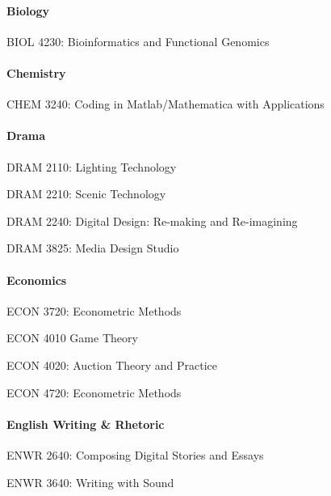 \paragraph{Biology}
\begin{itemlist}
\item BIOL 4230: Bioinformatics and Functional Genomics
\end{itemlist}


\paragraph{Chemistry}
\begin{itemlist}
\item CHEM 3240: Coding in Matlab/Mathematica with Applications
\end{itemlist}


\paragraph{Drama}
\begin{itemlist}
\item DRAM 2110: Lighting Technology
\item DRAM 2210: Scenic Technology
\item DRAM 2240: Digital Design: Re-making and Re-imagining
\item DRAM 3825: Media Design Studio
\end{itemlist}


\paragraph{Economics}
\begin{itemlist}
\item ECON 3720: Econometric Methods 
\item ECON 4010 Game Theory
\item ECON 4020: Auction Theory and Practice
\item ECON 4720: Econometric Methods
\end{itemlist}

\paragraph{English Writing \& Rhetoric}
\begin{itemlist}
\item ENWR 2640: Composing Digital Stories and Essays
\item ENWR 3640: Writing with Sound
\end{itemlist}

